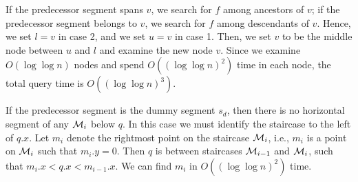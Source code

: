 \documentclass[10pt]{llncs}
\newcommand{\cM}{{\cal M}}
\begin{document}
If the  predecessor segment spans $v$, we search for $f$ among  ancestors 
of $v$;
if the  predecessor segment belongs to $v$, we search for $f$ among 
descendants 
of $v$.  Hence, we set $l=v$ in case 2, and we set $u=v$ in 
case 1. 
Then, we set $v$ to be the middle node between $u$ and $l$ and examine 
the new node $v$. Since we examine $O(\log \log n)$ nodes and spend 
$O((\log \log n)^2)$ time in each node, the total query time is 
$O((\log \log n)^3)$.

If the predecessor segment is the dummy segment $s_d$, then 
there is no horizontal segment of any $\cM_i$ below $q$. 
In this case we must identify the staircase to the left of $q.x$.
Let $m_i$ denote the rightmost point on the staircase $\cM_i$, 
i.e., $m_i$ is a point on $\cM_i$ such that  $m_i.y=0$. 
Then $q$ is between staircases $\cM_{i-1}$ and $\cM_i$, such that 
$m_i.x < q.x < m_{i-1}.x$. We can find $m_i$ in $O((\log\log n)^2)$ 
time. 
\end{document}
